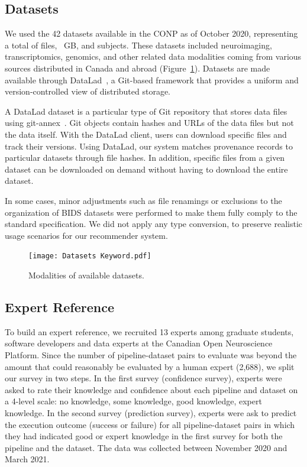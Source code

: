 \documentclass[conference]{IEEEtran}
\begin{document}
\subsection{Datasets} 

We used the 42 datasets available in the CONP as of October 2020,
representing a total of  files, ~GB, and  subjects.
These datasets included neuroimaging, transcriptomics, genomics, and other
related data modalities coming from various sources distributed in Canada
and abroad (Figure~\ref{fig:datasets_modalities}). Datasets are made available through DataLad~\cite{datalad2021},
a Git-based framework that provides a uniform and version-controlled view of
distributed storage.

A DataLad dataset is a particular type of Git repository that stores
 data files using git-annex~\cite{gitannex}. Git objects contain
hashes and URLs of the data files but not the data itself. With the DataLad
client, users can download specific files and track their versions. Using
DataLad, our system matches provenance records to particular datasets
through file hashes. In addition, specific files from a given dataset can
be downloaded on demand without having to download the entire dataset. 

 In some cases, minor adjustments such as file renamings or exclusions
  to the organization of BIDS
 datasets were performed to make them fully comply to the standard
 specification. We did not apply any type conversion, to preserve realistic
 usage scenarios for our recommender system. \begin{figure}
  \texttt{[image: Datasets Keyword.pdf]}
  \caption{Modalities of available datasets. }
  \label{fig:datasets_modalities}
\end{figure}


\subsection{Expert Reference}

To build an expert reference, we recruited 13 experts among graduate
students, software developers and data experts at the Canadian Open
Neuroscience Platform. Since the number of pipeline-dataset pairs to
evaluate was beyond the amount that could reasonably be evaluated by a
human expert (2,688), we split our survey in two steps. In the first survey
(confidence survey), experts were asked to rate their knowledge and
confidence about each pipeline and dataset on a 4-level scale: no
knowledge, some knowledge, good knowledge, expert knowledge. In the second
survey (prediction survey), experts were ask to predict the execution
outcome (success or failure) for all pipeline-dataset pairs in which they
had indicated good or expert knowledge in the first survey for both the
pipeline and the dataset. The data was collected between November 2020 and
March 2021.
\end{document}
